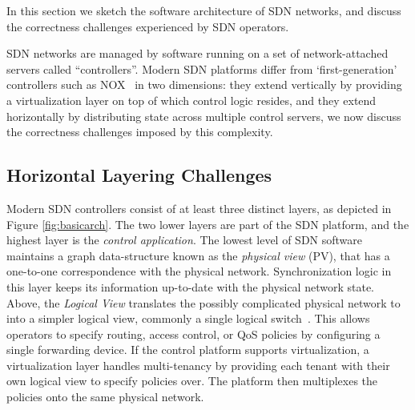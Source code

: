 In this section we sketch the software architecture of SDN networks, and discuss
the correctness challenges experienced by SDN operators.

SDN networks are managed by software running on a set of network-attached
servers called ``controllers''. Modern SDN platforms differ from
`first-generation' controllers such as NOX~\cite{nox} in two dimensions: they
extend vertically by providing a virtualization layer on top of which control
logic resides, and they extend horizontally by distributing state across
multiple control servers, we now discuss the correctness challenges imposed by
this complexity.




\subsection{Horizontal Layering Challenges}
Modern SDN controllers consist of at least three distinct layers, as depicted in
Figure \ref{fig:basicarch}. The two lower layers are part of the SDN platform,
and the highest layer is the \emph{control application}. The lowest level of SDN
software maintains a graph data-structure known as the \emph{physical view}
(PV), that has a one-to-one correspondence with the physical network.
Synchronization logic in this layer keeps its information up-to-date with the
physical network state. Above, the \emph{Logical View} translates the possibly
complicated physical network to into a simpler logical view, commonly a single
logical switch~\cite{Casado:2010:VNF:1921151.1921162}. This allows operators to
specify routing, access control, or QoS policies by configuring a single
forwarding device. If the control platform supports virtualization, a
virtualization layer handles multi-tenancy by providing each tenant with their
own logical view to specify policies over. The platform then multiplexes the
policies onto the same physical network.

